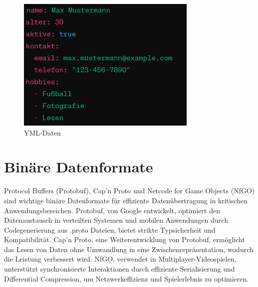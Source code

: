 \begin{figure}[h]
\begin{minipage}{0.32\textwidth}
		\includegraphics[width=\textwidth]{figures/ymlexample.png}
		\caption{YML-Daten}
		\label{fig:yaml}
	\end{minipage}
\end{figure}


\section{Binäre Datenformate}

Protocol Buffers (Protobuf), Cap'n Proto und Netcode for Game Objects (NfGO) sind wichtige binäre Datenformate für effiziente Datenübertragung in kritischen Anwendungsbereichen. Protobuf, von Google entwickelt, optimiert den Datenaustausch in verteilten Systemen und mobilen Anwendungen durch Codegenerierung aus .proto Dateien, bietet strikte Typsicherheit und Kompatibilität. Cap'n Proto, eine Weiterentwicklung von Protobuf, ermöglicht das Lesen von Daten ohne Umwandlung in eine Zwischenrepräsentation, wodurch die Leistung verbessert wird. NfGO, verwendet in Multiplayer-Videospielen, unterstützt synchronisierte Interaktionen durch effiziente Serialisierung und Differential Compression, um Netzwerkeffizienz und Spielerlebnis zu optimieren.

